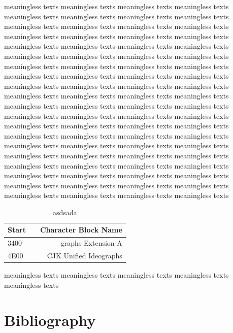 \documentclass[12pt, twoside, notitlepage, twocolumn]{article}
\begin{document}
        meaningless texts meaningless texts meaningless texts meaningless texts meaningless texts 
        meaningless texts meaningless texts meaningless texts meaningless texts meaningless texts 
        meaningless texts meaningless texts meaningless texts meaningless texts meaningless texts 
        meaningless texts meaningless texts meaningless texts meaningless texts meaningless texts 
        meaningless texts meaningless texts meaningless texts meaningless texts meaningless texts 
        meaningless texts meaningless texts meaningless texts meaningless texts meaningless texts 
        meaningless texts meaningless texts meaningless texts meaningless texts meaningless texts 
        meaningless texts meaningless texts meaningless texts meaningless texts meaningless texts 
        meaningless texts meaningless texts meaningless texts meaningless texts meaningless texts 
        meaningless texts meaningless texts meaningless texts meaningless texts meaningless texts 
        meaningless texts meaningless texts meaningless texts meaningless texts meaningless texts 
        meaningless texts meaningless texts meaningless texts meaningless texts meaningless texts 
        meaningless texts meaningless texts meaningless texts meaningless texts meaningless texts 
        meaningless texts meaningless texts meaningless texts meaningless texts meaningless texts 
        meaningless texts meaningless texts meaningless texts meaningless texts meaningless texts 
        meaningless texts meaningless texts meaningless texts meaningless texts meaningless texts 
        \begin{table}
            \centering
            \begin{tabularx}{9.73cm}{lXr}
            \hline
            Start & & Character Block Name \\
            \hline
            3400  & & graphs Extension A \\
            4E00  & & CJK Unified Ideographs \\
            \hline
            \end{tabularx}
            \caption{asdsada}
        \end{table}
        meaningless texts meaningless texts meaningless texts meaningless texts meaningless texts 
        \section*{Bibliography}
        
        
    
\end{document}
